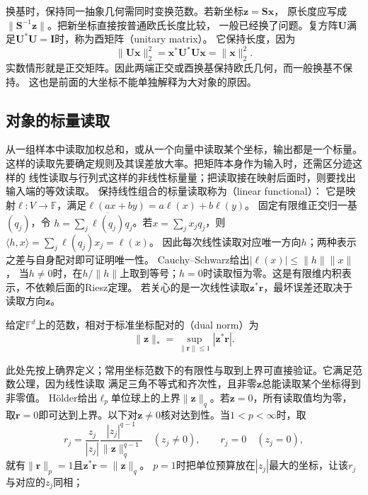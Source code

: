 换基时，保持同一抽象几何需同时变换范数。若新坐标$\bm z=\bm S\bm x$，
原长度应写成$\lVert\bm S^{-1}\bm z\rVert$。把新坐标直接按普通欧氏长度比较，
一般已经换了问题。复方阵$\bm U$满足$\bm U^*\bm U=\bm I$时，称为酉矩阵（unitary matrix）。
它保持长度，因为
\[
 \lVert\bm U\bm x\rVert_2^2
 =\bm x^*\bm U^*\bm U\bm x
 =\lVert\bm x\rVert_2^2.
\]
实数情形就是正交矩阵。因此两端正交或酉换基保持欧氏几何，而一般换基不保持。
这也是前面的大坐标不能单独解释为大对象的原因。

\subsection{对象的标量读取}
\label{sec:linear-algebra-scalar-readouts}

从一组样本中读取加权总和，或从一个向量中读取某个坐标，输出都是一个标量。
这样的读取先要确定规则及其误差放大率。把矩阵本身作为输入时，还需区分迹这样的
线性读取与行列式这样的非线性标量量；把读取接在映射后面时，则要找出输入端的等效读取。
保持线性组合的标量读取称为（linear functional）：
它是映射$\ell:V\to\mathbb F$，满足$\ell(ax+by)=a\ell(x)+b\ell(y)$。
固定有限维正交归一基$(q_j)$，令
$h=\sum_j\overline{\ell(q_j)}q_j$。若$x=\sum_j x_jq_j$，则
$\langle h,x\rangle=\sum_j\ell(q_j)x_j=\ell(x)$。
因此每次线性读取对应唯一方向$h$；两种表示之差与自身配对即可证明唯一性。
Cauchy--Schwarz给出$|\ell(x)|\leq\lVert h\rVert\lVert x\rVert$，
当$h\neq0$时，在$h/\lVert h\rVert$上取到等号；$h=0$时读取恒为零。这是有限维内积表示，不依赖后面的Riesz定理。
若关心的是一次线性读取$\bm z^*\bm r$，最坏误差还取决于读取方向$\bm z$。
\begin{definition}[有限维对偶范数]
\label{def:linear-algebra-dual-norm}
给定$\mathbb F^d$上的范数，相对于标准坐标配对的（dual norm）为
\begin{equation}
 \lVert\bm z\rVert_*=\sup_{\lVert\bm r\rVert\leq1}|\bm z^*\bm r|.
 \label{eq:linear-algebra-dual-norm-definition}
\end{equation}
\end{definition}
此处先按上确界定义；常用坐标范数下的有限性与取到上界可直接验证。它满足范数公理，因为线性读取
满足三角不等式和齐次性，且非零$\bm z$总能读取某个坐标得到非零值。
Hölder给出$\ell_p$单位球上的上界$\lVert\bm z\rVert_q$。若$\bm z=0$，所有读取值均为零，
取$\bm r=0$即可达到上界。以下对$\bm z\neq0$核对达到性。当$1<p<\infty$时，取
\[
 r_j=\frac{z_j}{|z_j|}
       \frac{|z_j|^{q-1}}{\lVert\bm z\rVert_q^{q-1}}\quad(z_j\neq0),
 \qquad r_j=0\quad(z_j=0),
\]
就有$\lVert\bm r\rVert_p=1$且$\bm z^*\bm r=\lVert\bm z\rVert_q$。
$p=1$时把单位预算放在$|z_j|$最大的坐标，让该$r_j$与对应的$z_j$同相；
